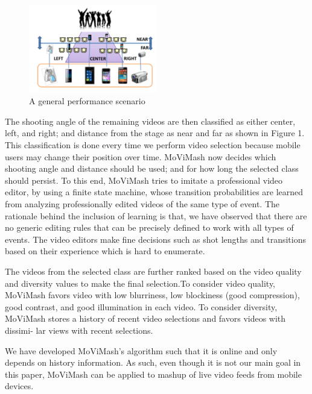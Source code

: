 \documentclass{sig-alternate}
\begin{document}
\begin{figure}[h]
    \centering
    \includegraphics[width=0.5\textwidth]{img1.png}
    \caption{A general performance scenario}
    \label{fig:mesh1}
\end{figure}

The shooting angle of the remaining videos are then classified as either center, left, and right; and distance from the stage as near and far as shown in Figure 1. This classification is done every time we perform video selection because mobile users may change their position over time. MoViMash now decides which shooting angle and distance should be used; and for how long the selected class should persist. To this end, MoViMash tries to imitate a professional video editor, by using a finite state machine, whose transition probabilities are learned from analyzing professionally edited videos of the same type of event. The rationale behind the inclusion of learning is that, we have observed that there are no generic editing rules that can be precisely defined to work with all types of events. The video editors make fine decisions such as shot lengths and transitions based on their experience which is hard to enumerate.

The videos from the selected class are further ranked based on the video quality and diversity values to make the final selection.To consider video quality, MoViMash favors video with low blurriness, low blockiness (good compression), good contrast, and good illumination in each video. To consider diversity, MoViMash stores a history of recent video selections and favors videos with dissimi-
lar views with recent selections.

We have developed MoViMash’s algorithm such that it is online and only depends on history information. As such, even though it is not our main goal in this paper, MoViMash can be applied to mashup of live video feeds from mobile devices.
\end{document}
